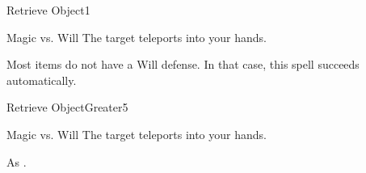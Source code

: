 \begin{spellsection}{Retrieve Object}{1}
\begin{spellheader}
\end{spellheader}
\begin{spellcontent}
    \begin{spelltargetinginfo}
    \end{spelltargetinginfo}
    \begin{spelleffects}
        \begin{spellattack}{Magic vs. Will}
            \spellsuccess The target teleports into your hands.
        \end{spellattack}
    \end{spelleffects}
\end{spellcontent}
\begin{spellfooter}
    \spellnotes Most items do not have a Will defense. In that case, this spell succeeds automatically.
\end{spellfooter}
\end{spellsection}

\begin{spellsection}{Retrieve Object}{Greater}{5}
\begin{spellheader}
\end{spellheader}
\begin{spellcontent}
    \begin{spelltargetinginfo}
    \end{spelltargetinginfo}
    \begin{spelleffects}
        \begin{spellattack}{Magic vs. Will}
            \spelleffect The target teleports into your hands.
        \end{spellattack}
    \end{spelleffects}
\end{spellcontent}
\begin{spellfooter}
    \spellnotes As .
\end{spellfooter}
\end{spellsection}


